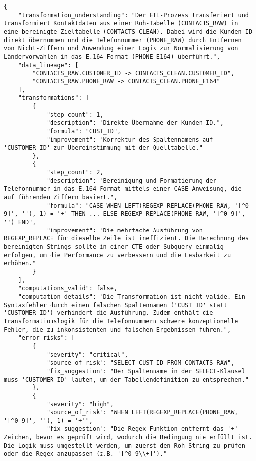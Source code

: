 \begin{lstlisting}[caption={Ausgabe: GEMINI 2.5 Pro Anwendungsfall 3 Konsistenzdurchlauf},label={gemini_case3_prompt2}]
{
    "transformation_understanding": "Der ETL-Prozess transferiert und transformiert Kontaktdaten aus einer Roh-Tabelle (CONTACTS_RAW) in eine bereinigte Zieltabelle (CONTACTS_CLEAN). Dabei wird die Kunden-ID direkt übernommen und die Telefonnummer (PHONE_RAW) durch Entfernen von Nicht-Ziffern und Anwendung einer Logik zur Normalisierung von Ländervorwahlen in das E.164-Format (PHONE_E164) überführt.",
    "data_lineage": [
        "CONTACTS_RAW.CUSTOMER_ID -> CONTACTS_CLEAN.CUSTOMER_ID",
        "CONTACTS_RAW.PHONE_RAW -> CONTACTS_CLEAN.PHONE_E164"
    ],
    "transformations": [
        {
            "step_count": 1,
            "description": "Direkte Übernahme der Kunden-ID.",
            "formula": "CUST_ID",
            "improvement": "Korrektur des Spaltennamens auf 'CUSTOMER_ID' zur Übereinstimmung mit der Quelltabelle."
        },
        {
            "step_count": 2,
            "description": "Bereinigung und Formatierung der Telefonnummer in das E.164-Format mittels einer CASE-Anweisung, die auf führenden Ziffern basiert.",
            "formula": "CASE WHEN LEFT(REGEXP_REPLACE(PHONE_RAW, '[^0-9]', ''), 1) = '+' THEN ... ELSE REGEXP_REPLACE(PHONE_RAW, '[^0-9]', '') END",
            "improvement": "Die mehrfache Ausführung von REGEXP_REPLACE für dieselbe Zeile ist ineffizient. Die Berechnung des bereinigten Strings sollte in einer CTE oder Subquery einmalig erfolgen, um die Performance zu verbessern und die Lesbarkeit zu erhöhen."
        }
    ],
    "computations_valid": false,
    "computation_details": "Die Transformation ist nicht valide. Ein Syntaxfehler durch einen falschen Spaltennamen ('CUST_ID' statt 'CUSTOMER_ID') verhindert die Ausführung. Zudem enthält die Transformationslogik für die Telefonnummern schwere konzeptionelle Fehler, die zu inkonsistenten und falschen Ergebnissen führen.",
    "error_risks": [
        {
            "severity": "critical",
            "source_of_risk": "SELECT CUST_ID FROM CONTACTS_RAW",
            "fix_suggestion": "Der Spaltenname in der SELECT-Klausel muss 'CUSTOMER_ID' lauten, um der Tabellendefinition zu entsprechen."
        },
        {
            "severity": "high",
            "source_of_risk": "WHEN LEFT(REGEXP_REPLACE(PHONE_RAW, '[^0-9]', ''), 1) = '+'",
            "fix_suggestion": "Die Regex-Funktion entfernt das '+' Zeichen, bevor es geprüft wird, wodurch die Bedingung nie erfüllt ist. Die Logik muss umgestellt werden, um zuerst den Roh-String zu prüfen oder die Regex anzupassen (z.B. '[^0-9\\+]')."

\end{lstlisting}
